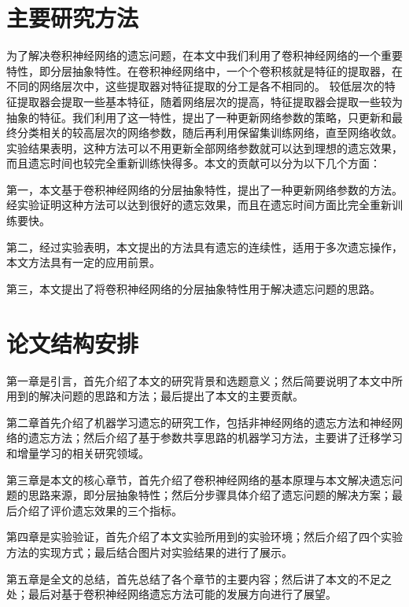 \section{主要研究方法}
为了解决卷积神经网络的遗忘问题，在本文中我们利用了卷积神经网络的一个重要特性，即分层抽象特性。在卷积神经网络中，一个个卷积核就是特征的提取器，在不同的网络层次中，这些提取器对特征提取的分工是各不相同的。
较低层次的特征提取器会提取一些基本特征，随着网络层次的提高，特征提取器会提取一些较为抽象的特征。我们利用了这一特性，提出了一种更新网络参数的策略，只更新和最终分类相关的较高层次的网络参数，随后再利用保留集训练网络，直至网络收敛。
实验结果表明，这种方法可以不用更新全部网络参数就可以达到理想的遗忘效果，而且遗忘时间也较完全重新训练快得多。本文的贡献可以分为以下几个方面：

第一，本文基于卷积神经网络的分层抽象特性，提出了一种更新网络参数的方法。经实验证明这种方法可以达到很好的遗忘效果，而且在遗忘时间方面比完全重新训练要快。

第二，经过实验表明，本文提出的方法具有遗忘的连续性，适用于多次遗忘操作，本文方法具有一定的应用前景。

第三，本文提出了将卷积神经网络的分层抽象特性用于解决遗忘问题的思路。

\section{论文结构安排}
第一章是引言，首先介绍了本文的研究背景和选题意义；然后简要说明了本文中所用到的解决问题的思路和方法；最后提出了本文的主要贡献。

第二章首先介绍了机器学习遗忘的研究工作，包括非神经网络的遗忘方法和神经网络的遗忘方法；然后介绍了基于参数共享思路的机器学习方法，主要讲了迁移学习和增量学习的相关研究领域。

第三章是本文的核心章节，首先介绍了卷积神经网络的基本原理与本文解决遗忘问题的思路来源，即分层抽象特性；然后分步骤具体介绍了遗忘问题的解决方案；最后介绍了评价遗忘效果的三个指标。

第四章是实验验证，首先介绍了本文实验所用到的实验环境；然后介绍了四个实验方法的实现方式；最后结合图片对实验结果的进行了展示。

第五章是全文的总结，首先总结了各个章节的主要内容；然后讲了本文的不足之处；最后对基于卷积神经网络遗忘方法可能的发展方向进行了展望。
